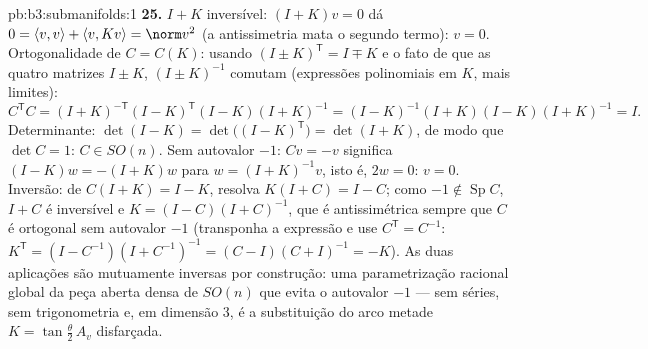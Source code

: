\begin{solution}{pb:b3:submanifolds:1}
\textbf{25.} $I + K$ inversível: $(I + K)v = 0$ dá $0 =
\langle v, v\rangle + \langle v, Kv\rangle = \norm v^2$
(a antissimetria mata o segundo termo): $v = 0$. Ortogonalidade
de $C = C(K)$: usando $(I \pm K)^{\mathsf T} = I \mp K$ e
o fato de que as quatro matrizes $I \pm K$, $(I \pm K)^{-1}$
comutam (expressões polinomiais em $K$, mais limites):
\[
C^{\mathsf T}C = (I + K)^{-\mathsf T}(I - K)^{\mathsf T}
(I - K)(I + K)^{-1}
= (I - K)^{-1}(I + K)(I - K)(I + K)^{-1} = I .
\]
Determinante: $\det(I - K) = \det\bigl((I - K)^{\mathsf
T}\bigr) = \det(I + K)$, de modo que $\det C = 1$: $C \in SO(n)$.
Sem autovalor $-1$: $Cv = -v$ significa $(I - K)w = -(I + K)w$
para $w = (I + K)^{-1}v$, isto é, $2w = 0$: $v = 0$.
Inversão: de $C(I + K) = I - K$, resolva $K(I + C) = I -
C$; como $-1 \notin \operatorname{Sp}C$, $I + C$ é
inversível e $K = (I - C)(I + C)^{-1}$, que é
antissimétrica sempre que $C$ é ortogonal sem autovalor
$-1$ (transponha a expressão e use $C^{\mathsf T} =
C^{-1}$: $K^{\mathsf T} = (I - C^{-1})(I + C^{-1})^{-1} =
(C - I)(C + I)^{-1} = -K$). As duas aplicações são mutuamente
inversas por construção: uma parametrização racional global
da peça aberta densa de $SO(n)$ que evita o autovalor $-1$
--- sem séries, sem trigonometria e, em dimensão $3$, é
a substituição do arco metade $K = \tan\frac\theta2\,A_v$
disfarçada.
\end{solution}
